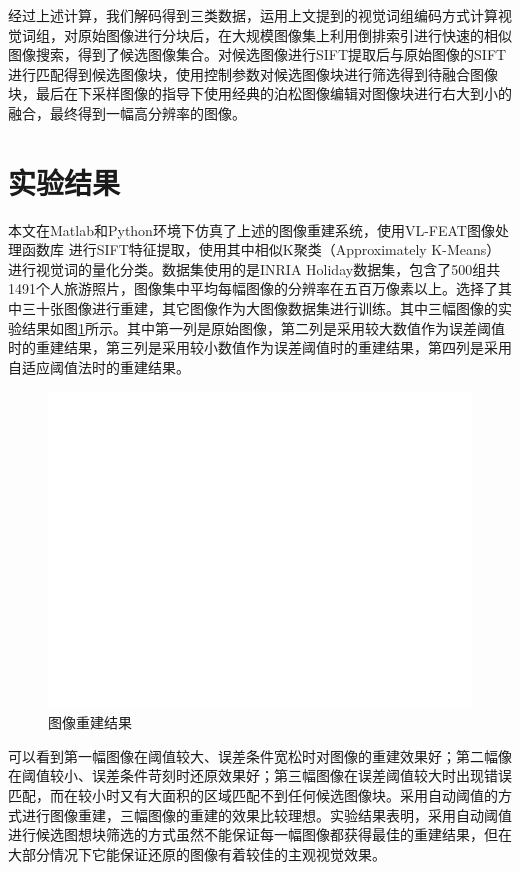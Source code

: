 \documentclass[UTF8]{csoarticle}
\begin{document}
经过上述计算，我们解码得到三类数据，运用上文提到的视觉词组编码方式计算视觉词组，对原始图像进行分块后，在大规模图像集上利用倒排索引进行快速的相似图像搜索，得到了候选图像集合。对候选图像进行SIFT提取后与原始图像的SIFT进行匹配得到候选图像块，使用控制参数对候选图像块进行筛选得到待融合图像块，最后在下采样图像的指导下使用经典的泊松图像编辑\cite{Perez:2003ul}对图像块进行右大到小的融合，最终得到一幅高分辨率的图像。


\section{实验结果}
本文在Matlab和Python环境下仿真了上述的图像重建系统，使用VL-FEAT图像处理函数库
\cite{vl_feat}进行SIFT特征提取，使用其中相似K聚类（Approximately K-Means）进行视觉词的量化分类。数据集使用的是INRIA Holiday数据集\cite{INRIA}，包含了500组共1491个人旅游照片，图像集中平均每幅图像的分辨率在五百万像素以上。选择了其中三十张图像进行重建，其它图像作为大图像数据集进行训练。其中三幅图像的实验结果如图\ref{fig:result}所示。其中第一列是原始图像，第二列是采用较大数值作为误差阈值时的重建结果，第三列是采用较小数值作为误差阈值时的重建结果，第四列是采用自适应阈值法时的重建结果。

\begin{figure}
\centering\includegraphics[width=15cm]{rec_result}
\caption{图像重建结果}
\label{fig:result}
\end{figure}

可以看到第一幅图像在阈值较大、误差条件宽松时对图像的重建效果好；第二幅像在阈值较小、误差条件苛刻时还原效果好；第三幅图像在误差阈值较大时出现错误匹配，而在较小时又有大面积的区域匹配不到任何候选图像块。采用自动阈值的方式进行图像重建，三幅图像的重建的效果比较理想。实验结果表明，采用自动阈值进行候选图想块筛选的方式虽然不能保证每一幅图像都获得最佳的重建结果，但在大部分情况下它能保证还原的图像有着较佳的主观视觉效果。
\end{document}
